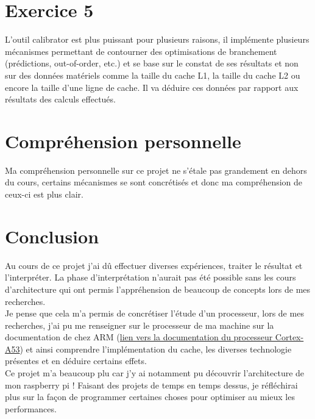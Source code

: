 \documentclass[11pt,a4paper]{article}
\begin{document}
\section{Exercice 5}
L'outil calibrator est plus puissant pour plusieurs raisons, il implémente plusieurs mécanismes permettant de contourner des optimisations de branchement (prédictions, out-of-order, etc.) et se base sur le constat de ses résultats et non sur des données matériels comme la taille du cache L1, la taille du cache L2 ou encore la taille d'une ligne de cache. Il va déduire ces données par rapport aux résultats des calculs effectués.

\section{Compréhension personnelle}

Ma compréhension personnelle sur ce projet ne s'étale pas grandement en dehors du cours, certains mécanismes se sont concrétisés et donc ma compréhension de ceux-ci est plus clair.

\section{Conclusion}
Au cours de ce projet j'ai dû effectuer diverses expériences, traiter le résultat et l'interpréter. La phase d'interprétation n'aurait pas été possible sans les cours d'architecture qui ont permis l'appréhension de beaucoup de concepts lors de mes recherches. \\Je pense que cela m'a permis de concrétiser l'étude d'un processeur, lors de mes recherches, j'ai pu me renseigner sur le processeur de ma machine sur la documentation de chez ARM (\href{http://infocenter.arm.com/help/topic/com.arm.doc.ddi0500e/BABJBFEJ.html}{lien vers la documentation du processeur Cortex-A53}) et ainsi comprendre l'implémentation du cache, les diverses technologie présentes et en déduire certains effets.\\
Ce projet m'a beaucoup plu car j'y ai notamment pu découvrir l'architecture de mon raspberry pi ! Faisant des projets de temps en temps dessus, je réfléchirai plus sur la façon de programmer certaines choses pour optimiser au mieux les performances.
\end{document}

